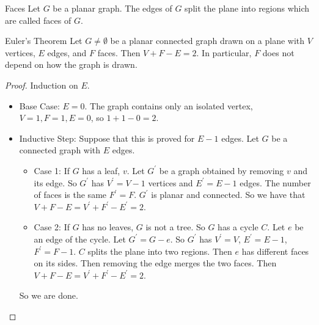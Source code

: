 \documentclass{report}
\begin{document}
\begin{definition}{Faces}
    Let $G$ be a planar graph. The edges of $G$ split the plane into regions which are called faces of $G$.
\end{definition}

\begin{theorem}{Euler's Theorem}
    Let $G \neq \emptyset$ be a planar connected graph drawn on a plane with $V$ vertices, $E$ edges, and $F$ faces. Then $V + F - E = 2$. In particular, $F$ does not depend on how the graph is drawn.
\end{theorem}
    \begin{proof}
        Induction on $E$.
            \begin{itemize}
                \item Base Case: $E = 0$. The graph contains only an isolated vertex, $V = 1, F = 1, E = 0$, so $1 + 1 - 0 = 2$.

                \item Inductive Step: Suppose that this is proved for $E - 1$ edges. Let $G$ be a connected graph with $E$ edges. 
                    \begin{itemize}
                        \item Case 1: If $G$ has a leaf, $v$. Let $G^{\prime}$ be a graph obtained by removing $v$ and its edge. So $G^{\prime}$ has $V^{\prime} = V - 1$ vertices and $E^{\prime} = E - 1$ edges. The number of faces is the same $F^{\prime} = F$. $G^{\prime}$ is planar and connected. So we have that $V + F - E = V^{\prime} + F^{\prime} - E^{\prime} = 2$.

                        \item Case 2: If $G$ has no leaves, $G$ is not a tree. So $G$ has a cycle $C$. Let $e$ be an edge of the cycle. Let $G^{\prime} = G - e$. So $G^{\prime}$ has $V^{\prime} = V$, $E^{\prime} = E - 1$, $F^{\prime} = F - 1$. $C$ splits the plane into two regions. Then $e$ has different faces on its sides. Then removing the edge merges the two faces. Then $V + F - E = V^{\prime} + F^{\prime} - E^{\prime} = 2$.
                    \end{itemize}
                So we are done.
            \end{itemize}
    \end{proof}
\end{document}
